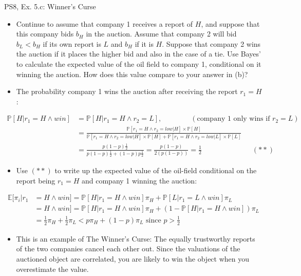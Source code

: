 \begin{frame}{PS8, Ex. 5.c: Winner's Curse}
      \begin{itemize}
        \item[(c)] Continue to assume that company 1 receives a report of $H$, and suppose that this company bids $b_H$ in the auction. Assume that company 2 will bid $b_L < b_H$ if its own report is $L$ and $b_H$ if it is $H$. Suppose that company 2 wins the auction if it places the higher bid and also in the case of a tie. Use Bayes’ to calculate the expected value of the oil field to company 1, conditional on it winning the auction. How does this value compare to your answer in (b)?
        \item[Step 1:] The probability company 1 wins the auction after receiving the report $r_1=H$:
        \end{itemize}
        \vspace{-10pt}
        \begin{align*}
          \mathbb{P}[H|r_1=H\wedge win]&=\mathbb{P}[H|r_1=H\wedge r_2=L],\quad\quad\quad\quad(\text{company 1 only wins if }r_2=L)\\
            &=\frac{\mathbb{P}[r_1=H\wedge r_2=low|H]\times\mathbb{P}[H]}{\mathbb{P}[r_1=H\wedge r_2=low|H]\times\mathbb{P}[H]+\mathbb{P}[r_1=H\wedge r_2=low|L]\times\mathbb{P}[L]}&\\
            &=\frac{p(1-p)\frac{1}{2}}{p(1-p)\frac{1}{2}+(1-p)p\frac{1}{2}}=\frac{p(1-p)}{2(p(1-p))}=\frac{1}{2}\quad\quad\quad\quad\quad\quad\quad(**)
        \end{align*}
        \vspace{-12pt}
        \begin{itemize}
        \item[Step 2:] Use $(**)$ to write up the expected value of the oil-field conditional on the report being $r_1=H$ and company 1 winning the auction:
      \end{itemize}
      \vspace{-8pt}
      \begin{align*}
        \mathbb{E}[\pi_i|r_1&=H\wedge win]=\mathbb{P}[H|r_1=H\wedge win]\pi_H+\mathbb{P}[L|r_1=L\wedge win]\pi_L\\
        &=H\wedge win]=\mathbb{P}[H|r_1=H\wedge win]\pi_H+\left(1-\mathbb{P}[H|r_1=H\wedge win]\right)\pi_L\\
        &=\frac{1}{2}\pi_H+\frac{1}{2}\pi_L<p\pi_H+(1-p)\pi_L\text{   since   }p>\frac{1}{2}
      \end{align*}
      \vspace{-14pt}
      \begin{itemize}
        \item[Step 3:] This is an example of The Winner's Curse: The equally trustworthy reports of the two companies cancel each other out. Since the valuations of the auctioned object are correlated, you are likely to win the object when you overestimate the value.
      \end{itemize}
      \vfill\null
\end{frame}
